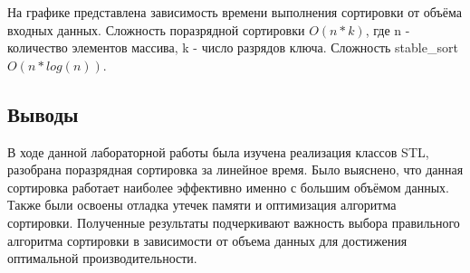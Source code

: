 \documentclass[12pt]{article}
\begin{document}
\begin{figure}[htbp]
    \centering
    \label{fig:graph}
\end{figure}

На графике представлена зависимость времени выполнения сортировки от объёма входных данных. Сложность поразрядной сортировки $O(n * k)$, где n - количество элементов массива, k - число разрядов ключа. Сложность stable\_sort $O(n*log(n))$.

\subsection*{Выводы}

В ходе данной лабораторной работы была изучена реализация классов STL, разобрана поразрядная сортировка за линейное время. Было выяснено, что данная сортировка работает наиболее эффективно именно с большим объёмом данных. Также были освоены отладка утечек памяти и оптимизация алгоритма сортировки. Полученные результаты подчеркивают важность выбора правильного алгоритма сортировки в зависимости от объема данных для достижения оптимальной производительности.
\end{document}
